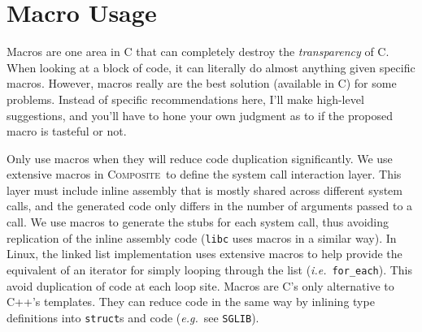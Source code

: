 \documentclass[11pt,onecolumn]{article}
\def\composite{\textsc{Composite}}
\def\eg{\textit{e.g.}}
\def\ie{\textit{i.e.}}
\newcommand{\head}[1]{\vspace{0.4em}\noindent{\bf #1}}
\begin{document}



\section{Macro Usage}
\label{s:macros}

Macros are one area in C that can completely destroy the {\em
  transparency} of C.  When looking at a block of code, it can
literally do almost anything given specific macros.  However, macros
really are the best solution (available in C) for some problems.
Instead of specific recommendations here, I'll make high-level
suggestions, and you'll have to hone your own judgment as to if the
proposed macro is tasteful or not.

\head{Suggestion 1.} Only use macros when they will reduce code
duplication significantly.  We use extensive macros in \composite\ to
define the system call interaction layer.  This layer must include
inline assembly that is mostly shared across different system calls,
and the generated code only differs in the number of arguments passed
to a call.  We use macros to generate the stubs for each system call,
thus avoiding replication of the inline assembly code ({\tt libc} uses
macros in a similar way).  In Linux, the linked list implementation
uses extensive macros to help provide the equivalent of an iterator
for simply looping through the list (\ie\ {\tt for\_each}).  This
avoid duplication of code at each loop site.  Macros are C's only
alternative to C++'s templates.  They can reduce code in the same way
by inlining type definitions into {\tt struct}s and code (\eg\ see
{\tt SGLIB}).
\end{document}
